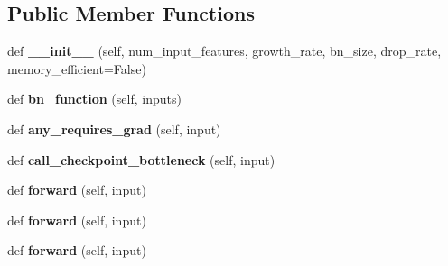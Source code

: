 \subsection*{Public Member Functions}
\begin{DoxyCompactItemize}
\item 
\mbox{\label{classtorchvision_1_1models_1_1densenet_1_1__DenseLayer_a9668043e6530dd3ff177721749ff5748}} 
def {\bfseries \+\_\+\+\_\+init\+\_\+\+\_\+} (self, num\+\_\+input\+\_\+features, growth\+\_\+rate, bn\+\_\+size, drop\+\_\+rate, memory\+\_\+efficient=False)
\item 
\mbox{\label{classtorchvision_1_1models_1_1densenet_1_1__DenseLayer_aab07069d4db2c9abe827f852e2fc9a9c}} 
def {\bfseries bn\+\_\+function} (self, inputs)
\item 
\mbox{\label{classtorchvision_1_1models_1_1densenet_1_1__DenseLayer_a5ac7859e83304930ce4e2333a0e4ab87}} 
def {\bfseries any\+\_\+requires\+\_\+grad} (self, input)
\item 
\mbox{\label{classtorchvision_1_1models_1_1densenet_1_1__DenseLayer_a69e6b580a2504dae3d3c2cf8f082d1b6}} 
def {\bfseries call\+\_\+checkpoint\+\_\+bottleneck} (self, input)
\item 
\mbox{\label{classtorchvision_1_1models_1_1densenet_1_1__DenseLayer_a1d07cf8bda875e365de5ef2f9ee911a2}} 
def {\bfseries forward} (self, input)
\item 
\mbox{\label{classtorchvision_1_1models_1_1densenet_1_1__DenseLayer_a1d07cf8bda875e365de5ef2f9ee911a2}} 
def {\bfseries forward} (self, input)
\item 
\mbox{\label{classtorchvision_1_1models_1_1densenet_1_1__DenseLayer_a1d07cf8bda875e365de5ef2f9ee911a2}} 
def {\bfseries forward} (self, input)
\end{DoxyCompactItemize}
